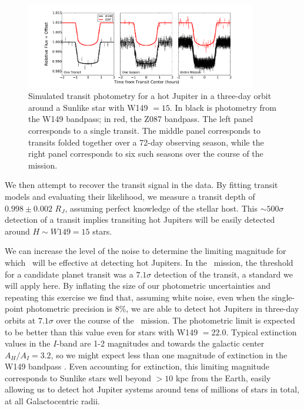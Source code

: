 \begin{figure}[htbp!]
\centerline{\includegraphics[width=0.9\textwidth]{chapter8/f2.pdf}}
\caption[Simulated transit photometry for a hot Jupiter in a three-day orbit
around a Sunlike star as observed with \WF.]{Simulated transit photometry for a hot Jupiter in a three-day orbit
around a Sunlike star with W149 $= 15$. In black is photometry from the
W149 bandpass; in red, the Z087 bandpass. The left panel corresponds to a single
transit. The middle panel corresponds to transits folded together over a 72-day
observing season, while the right panel corresponds to six such seasons over the
course of the mission.}
\label{fig:HJtrans}
\end{figure}

We then attempt to recover the transit signal in the data. By fitting transit
models and evaluating their likelihood, we measure a transit depth of
$0.998 \pm 0.002$ $R_J$, assuming perfect knowledge of the stellar host. 
This $\sim 500 \sigma$ detection of a transit implies
transiting hot Jupiters will be easily detected around $H \sim W149 = 15$ stars.

We can increase the level of the noise to determine the limiting magnitude
for which \WF\ will be effective at detecting hot Jupiters.
In the \kep\ mission, the threshold for a candidate planet transit was a $7.1\sigma$
detection of the transit, a standard we will apply here.
By inflating the size of our photometric uncertainties and repeating this exercise
we find that, assuming white noise, even when the single-point photometric precision
is 8\%, we are able to detect hot Jupiters in three-day orbits at $7.1 \sigma$ over
the course of the \WF\ mission.
The photometric limit is expected to be better than this value even
for stars with W149 $= 22.0$.
Typical extinction values in the $I$-band are 1-2 magnitudes \citep{Nataf13} and towards the 
galactic center $A_H/A_I = 3.2$, so we might expect less than one magnitude of
extinction in the W149 bandpass \citep{Nishiyama09, Nataf16}.
Even accounting for extinction, this limiting magnitude corresponds to Sunlike
stars well beyond $> 10$ kpc from the Earth, easily allowing us to detect hot Jupiter
systems around tens of millions of stars in total, at all Galactocentric radii.

